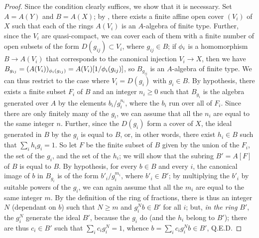 \begin{proof}
\label{proof-1.6.3.3}
Since the condition clearly suffices, we show that it is necessary.
Set $A=A(Y)$ and $B=A(X)$;
by , there exists a finite affine open cover $(V_i)$ of $X$ such that each of the rings $A(V_i)$ is an $A$-algebra of finite type.
Further, since the $V_i$ are quasi-compact, we can cover each of them with a finite number of open subsets of the form $D(g_{ij})\subset V_i$, where $g_{ij}\in B$;
if $\phi_i$ is a homomorphism $B\to A(V_i)$ that corresponds to the canonical injection $V_i\to X$, then we have $B_{g_{ij}}=(A(V_i))_{\phi_i(g_{ij})}=A(V_i)[1/\phi_i(g_{ij})]$, so $B_{g_{ij}}$ is an $A$-algebra of finite type.
We can thus restrict to the case where $V_i=D(g_i)$ with $g_i\in B$.
By hypothesis, there exists a finite subset $F_i$ of $B$ and an integer $n_i\geq0$ such that $B_{g_i}$ is the algebra generated over $A$ by the elements $b_i/g_i^{n_i}$, where the $b_i$ run over all of $F_i$.
Since there are only finitely many of the $g_i$, we can assume that all the $n_i$ are equal to the same integer $n$.
Further, since the $D(g_i)$ form a cover of $X$, the ideal generated in $B$ by the $g_i$ is equal to $B$, or, in other words, there exist $h_i\in B$ such that $\sum_i h_ig_i=1$.
So let $F$ be the finite subset of $B$ given by the union of the $F_i$, the set of the $g_i$, and the set of the $h_i$; we will show that the subring $B'=A[F]$ of $B$ is equal to $B$.
By hypothesis, for every $b\in B$ and every $i$, the canonical image of $b$ in $B_{g_i}$ is of the form $b'_i/g_i^{m_i}$, where $b'_i\in B'$;
by multiplying the $b'_i$ by suitable powers of the $g_i$, we can again assume that all the $m_i$ are equal to the same integer $m$.
By the definition of the ring of fractions, there is thus an integer $N$ (dependant on $b$) such that $N\geq m$ and $g_i^Nb\in B'$ for all $i$;
but, \emph{in the ring $B'$}, the $g_i^N$ generate the ideal $B'$, because the $g_i$ do (and the $h_i$ belong to $B'$);
there are thus $c_i\in B'$ such that $\sum_i c_ig_i^N=1$, whence $b=\sum_ic_ig_i^Nb\in B'$, Q.E.D.
\end{proof}

